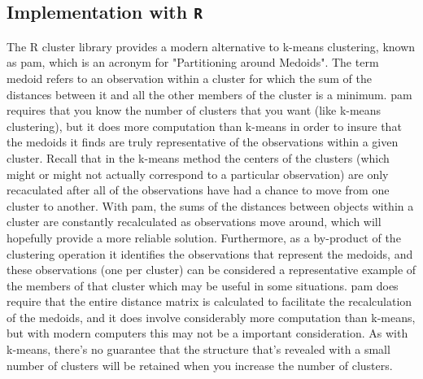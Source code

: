 \subsection{Implementation with \texttt{R}}
The R cluster library provides a modern alternative to k-means clustering, known as pam, which is an acronym for "Partitioning around Medoids". The term medoid refers to an observation within a cluster for which the sum of the distances between it and all the other members of the cluster is a minimum. pam requires that you know the number of clusters that you want (like k-means clustering), but it does more computation than k-means in order to insure that the medoids it finds are truly representative of the observations within a given cluster. Recall that in the k-means method the centers of the clusters (which might or might not actually correspond to a particular observation) are only recaculated after all of the observations have had a chance to move from one cluster to another. With pam, the sums of the distances between objects within a cluster are constantly recalculated as observations move around, which will hopefully provide a more reliable solution. Furthermore, as a by-product of the clustering operation it identifies the observations that represent the medoids, and these observations (one per cluster) can be considered a representative example of the members of that cluster which may be useful in some situations. pam does require that the entire distance matrix is calculated to facilitate the recalculation of the medoids, and it does involve considerably more computation than k-means, but with modern computers this may not be a important consideration. As with k-means, there's no guarantee that the structure that's revealed with a small number of clusters will be retained when you increase the number of clusters.
